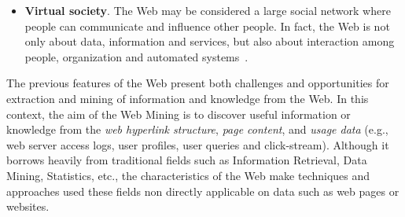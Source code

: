 \begin{itemize}


\item \textbf{Virtual society}. The Web may be considered a large social network where people can communicate and influence other people. In fact, the Web is not only about data, information and services, but also about interaction among people, organization and automated systems~\cite{Guille:2013}. 
\end{itemize}

The previous features of the Web present both challenges and opportunities for extraction and mining of information and knowledge from the Web. In this context, the aim of the Web Mining is to discover useful information or knowledge from the \textit{web hyperlink structure}, \textit{page content}, and \textit{usage data} (e.g., web server access logs, user profiles, user queries and click-stream).
Although it borrows heavily from traditional fields such as Information Retrieval, Data Mining, Statistics, etc., the characteristics of the Web make techniques and approaches used these fields non directly applicable on data such as web pages or websites. 

